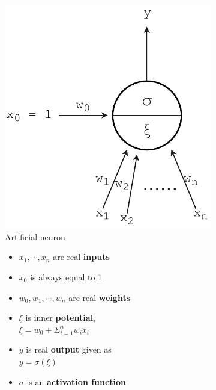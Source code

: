 \begin{figure}[h]
\raggedright
\begin{subfigure}{.35\textwidth}
  \centering
  \includegraphics[width=\textwidth]{tex/images/perceptron}
  \caption{Artificial neuron}
\end{subfigure}%
\hfill
\begin{subfigure}{.55\textwidth}
  \centering
  \begin{itemize}

	\item $x_1, \cdots, x_n$ are real \textbf{inputs}
	\item $x_0$ is always equal to 1
	\item $w_0, w_1, \cdots, w_n$ are real \textbf{weights}
	\item $\xi$ is inner \textbf{potential}, \\$\xi = w_0 + \Sigma_{i=1}^n w_i x_i$
	\item $y$ is real \textbf{output} given as \\ $y = \sigma(\xi)$
	\item $\sigma$ is an \textbf{activation function}

	\end{itemize}
\end{subfigure}
\end{figure}

